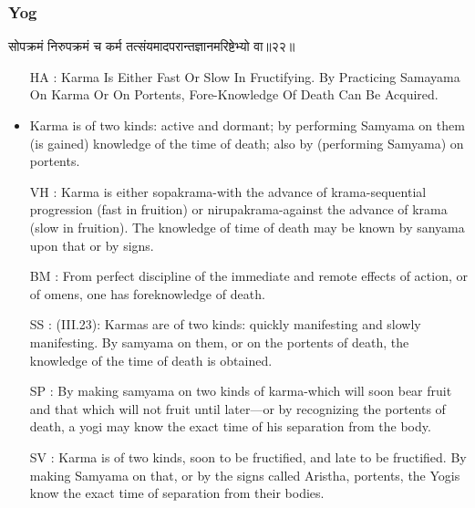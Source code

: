 \begin{frame}[fragile]\frametitle{Yog}
\begin{sanskrit}
सोपक्रमं निरुपक्रमं च कर्म तत्संयमादपरान्तज्ञानमरिष्टेभ्यो वा॥२२॥
\end{sanskrit}

	\begin{itemize}
	\item [HA]: Karma Is Either Fast Or Slow In Fructifying. By Practicing Samayama On Karma Or On Portents, Fore-Knowledge Of Death Can Be Acquired.
	\item Karma is of two kinds: active and dormant; by performing Samyama on them (is gained) knowledge of the time of death; also by (performing Samyama) on portents.
	\item [VH]: Karma is either sopakrama-with the advance of krama-sequential progression (fast in fruition) or nirupakrama-against the advance of krama (slow in fruition). The knowledge of time of death may be known by sanyama upon that or by signs.
	\item [BM]: From perfect discipline of the immediate and remote effects of action, or of omens, one has foreknowledge of death.
	\item [SS]: (III.23): Karmas are of two kinds: quickly manifesting and slowly manifesting. By samyama on them, or on the portents of death, the knowledge of the time of death is obtained.
	\item [SP]: By making samyama on two kinds of karma-which will soon bear fruit and that which will not fruit until later—or by recognizing the portents of death, a yogi may know the exact time of his separation from the body.
	\item [SV]: Karma is of two kinds, soon to be fructified, and late to be fructified. By making Samyama on that, or by the signs called Aristha, portents, the Yogis know the exact time of separation from their bodies. 
	\end{itemize}
\end{frame}


